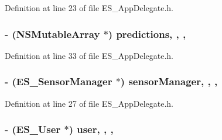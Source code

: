 Definition at line 23 of file E\+S\+\_\+\+App\+Delegate.\+h.

\hypertarget{interface_e_s___app_delegate_a99ee660141070586dfb12e58bbb2bb7f}{
\subsubsection[{predictions}]{\setlength{\rightskip}{0pt plus 5cm}-\/ (N\+S\+Mutable\+Array $\ast$) predictions\hspace{0.3cm}{\ttfamily [read]}, {\ttfamily [write]}, {\ttfamily [nonatomic]}, {\ttfamily [strong]}}}\label{interface_e_s___app_delegate_a99ee660141070586dfb12e58bbb2bb7f}


Definition at line 33 of file E\+S\+\_\+\+App\+Delegate.\+h.

\hypertarget{interface_e_s___app_delegate_a10cde2da011b136185a2ec1c487aa9b8}{
\subsubsection[{sensor\+Manager}]{\setlength{\rightskip}{0pt plus 5cm}-\/ ({\bf E\+S\+\_\+\+Sensor\+Manager} $\ast$) sensor\+Manager\hspace{0.3cm}{\ttfamily [read]}, {\ttfamily [write]}, {\ttfamily [nonatomic]}, {\ttfamily [strong]}}}\label{interface_e_s___app_delegate_a10cde2da011b136185a2ec1c487aa9b8}


Definition at line 27 of file E\+S\+\_\+\+App\+Delegate.\+h.

\hypertarget{interface_e_s___app_delegate_abe1e22079167d44f4bede0952f700c52}{
\subsubsection[{user}]{\setlength{\rightskip}{0pt plus 5cm}-\/ ({\bf E\+S\+\_\+\+User} $\ast$) user\hspace{0.3cm}{\ttfamily [read]}, {\ttfamily [write]}, {\ttfamily [nonatomic]}, {\ttfamily [strong]}}}\label{interface_e_s___app_delegate_abe1e22079167d44f4bede0952f700c52}


